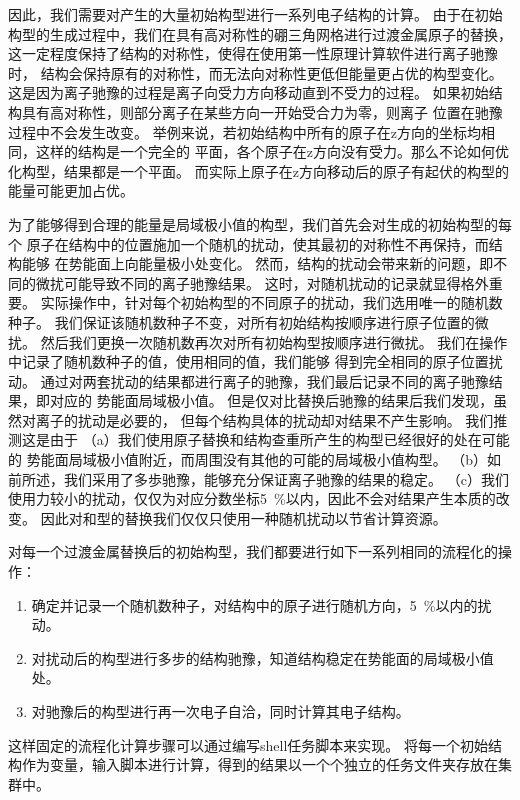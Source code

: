 因此，我们需要对产生的大量初始构型进行一系列电子结构的计算。
由于在初始构型的生成过程中，我们在具有高对称性的硼三角网格进行过渡金属原子的替换，
这一定程度保持了结构的对称性，使得在使用第一性原理计算软件进行离子驰豫时，
结构会保持原有的对称性，而无法向对称性更低但能量更占优的构型变化。
这是因为离子驰豫的过程是离子向受力方向移动直到不受力的过程。
如果初始结构具有高对称性，则部分离子在某些方向一开始受合力为零，则离子
位置在驰豫过程中不会发生改变。
举例来说，若初始结构中所有的原子在z方向的坐标均相同，这样的结构是一个完全的
平面，各个原子在z方向没有受力。那么不论如何优化构型，结果都是一个平面。
而实际上原子在z方向移动后的原子有起伏的构型的能量可能更加占优。

为了能够得到合理的能量是局域极小值的构型，我们首先会对生成的初始构型的每个
原子在结构中的位置施加一个随机的扰动，使其最初的对称性不再保持，而结构能够
在势能面上向能量极小处变化。
然而，结构的扰动会带来新的问题，即不同的微扰可能导致不同的离子驰豫结果。
这时，对随机扰动的记录就显得格外重要。
实际操作中，针对每个初始构型的不同原子的扰动，我们选用唯一的随机数种子。
我们保证该随机数种子不变，对所有初始结构按顺序进行原子位置的微扰。
然后我们更换一次随机数再次对所有初始构型按顺序进行微扰。
我们在操作中记录了随机数种子的值，使用相同的值，我们能够
得到完全相同的原子位置扰动。
通过对两套扰动的结果都进行离子的驰豫，我们最后记录不同的离子驰豫结果，即对应的
势能面局域极小值。
但是仅对比替换后驰豫的结果后我们发现，虽然对离子的扰动是必要的，
但每个结构具体的扰动却对结果不产生影响。
我们推测这是由于
（a）我们使用原子替换和结构查重所产生的构型已经很好的处在可能的
势能面局域极小值附近，而周围没有其他的可能的局域极小值构型。
（b）如前所述，我们采用了多歩驰豫，能够充分保证离子驰豫的结果的稳定。
（c）我们使用力较小的扰动，仅仅为对应分数坐标\SI{5}{\percent}以内，因此不会对结果产生本质的改变。
因此对和型的替换我们仅仅只使用一种随机扰动以节省计算资源。

对每一个过渡金属替换后的初始构型，我们都要进行如下一系列相同的流程化的操作：
\begin{enumerate}
  \item 确定并记录一个随机数种子，对结构中的原子进行随机方向，\SI{5}{\percent}以内的扰动。
  \item 对扰动后的构型进行多步的结构驰豫，知道结构稳定在势能面的局域极小值处。
  \item 对驰豫后的构型进行再一次电子自洽，同时计算其电子结构。
\end{enumerate}
这样固定的流程化计算步骤可以通过编写shell任务脚本来实现。
将每一个初始结构作为变量，输入脚本进行计算，得到的结果以一个个独立的任务文件夹存放在集群中。

